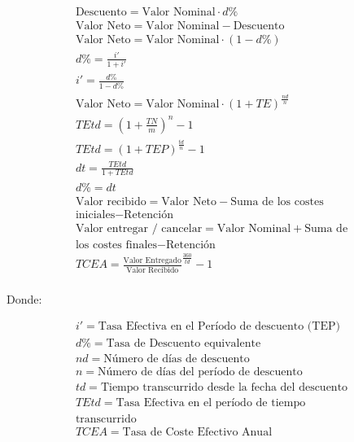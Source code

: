 \documentclass[a4paper, twocolumn]{article}
\begin{document}
\begin{gather*}
    \text{Descuento} = \text{Valor Nominal} \cdot d\% \\
    \text{Valor Neto} = \text{Valor Nominal} - \text{Descuento} \\
    \text{Valor Neto} = \text{Valor Nominal} \cdot (1 - d\%) \\
    d\% = \frac{i'}{1 + i'} \\
    i' = \frac{d\%}{1 - d\%} \\
    \text{Valor Neto} = \text{Valor Nominal} \cdot (1 + TE)^{\frac{nd}{n}} \\
    TEtd = (1 + \frac{TN}{m})^n - 1 \\
    TEtd = (1 + TEP)^\frac{td}{n} - 1 \\
    dt = \frac{TEtd}{1 + TEtd} \\
    d\% = dt \\
    \text{Valor recibido} = \text{Valor Neto} - \text{Suma de los costes} \\
    \text{iniciales} - \text{Retención} \\
    \text{Valor entregar / cancelar} = \text{Valor Nominal} + \text{Suma de} \\
    \text{los costes finales} - \text{Retención} \\
    TCEA = \frac{\text{Valor Entregado}}{\text{Valor Recibido}}^\frac{360}{td} - 1 \\
\end{gather*}

Donde:

\begin{gather*}
    i' = \text{Tasa Efectiva en el Período de descuento (TEP)} \\
    d\% = \text{Tasa de Descuento equivalente} \\
    nd = \text{Número de días de descuento} \\
    n = \text{Número de días del período de descuento} \\
    td = \text{Tiempo transcurrido desde la fecha del descuento} \\
    TEtd = \text{Tasa Efectiva en el período de tiempo} \\
    \text{transcurrido} \\
    TCEA = \text{Tasa de Coste Efectivo Anual} \\
\end{gather*}
\end{document}
